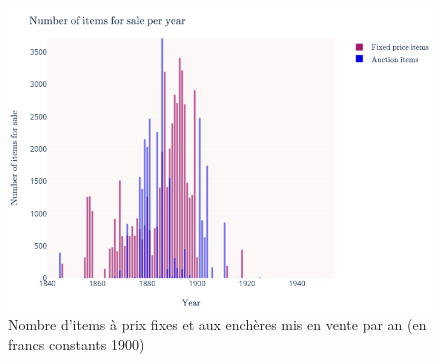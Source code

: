 \begin{figure}[h]
	\includegraphics[width=\textwidth]{annexes/fig_count_itm.png}
	\caption{Nombre d'items à prix fixes et aux enchères mis en vente par an (en francs constants 1900)}
	\label{fig:countitm}
\end{figure}

